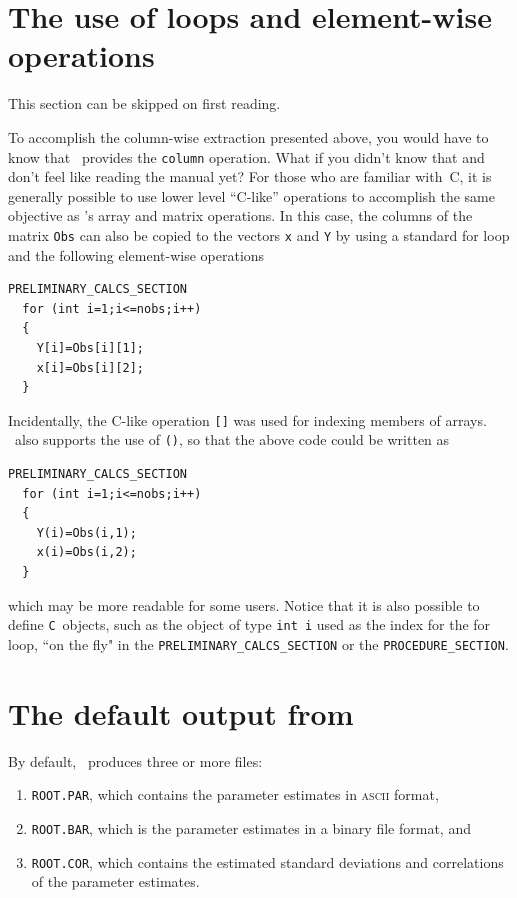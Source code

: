 \documentclass{admbmanual}
\begin{document}
\section{The use of loops and element-wise operations}

This section can be skipped on first reading.

To accomplish the column-wise extraction presented above, 
you would have to know that
\scAD\ provides the \texttt{column} operation. What if you didn't
know that and don't feel like reading the manual yet?
For those who are familiar with~C, 
 it is generally possible to use lower level ``C-like'' operations
to accomplish the same objective as \scAD's array and matrix operations.
In this case, the columns of the matrix \texttt{Obs} can also be
copied to the vectors \texttt{x} and \texttt{Y} by
using a standard for loop and the following element-wise operations
\begin{lstlisting}
PRELIMINARY_CALCS_SECTION
  for (int i=1;i<=nobs;i++)
  {
    Y[i]=Obs[i][1];
    x[i]=Obs[i][2];
  }
\end{lstlisting}
Incidentally, the C-like operation \texttt{[]} was used
for indexing members of arrays. \ADM\ also supports 
the use of \texttt{()}, so that the above code could be written as
\begin{lstlisting}
PRELIMINARY_CALCS_SECTION
  for (int i=1;i<=nobs;i++)
  {
    Y(i)=Obs(i,1);
    x(i)=Obs(i,2);
  }
\end{lstlisting}
which may be more readable for some users.
Notice that it is also possible to define \texttt{C}~objects,
such as the object of type \texttt{int i} used as the index for the 
for loop, ``on the fly" in the
\texttt{PRELIMINARY\_CALCS\_SECTION} or the \texttt{PROCEDURE\_SECTION}.


\section{The default output from \ADM}

By default, \ADM\ produces three or more files: 
\begin{enumerate}
\item \texttt{ROOT.PAR}, which contains the parameter
estimates in \textsc{ascii} format,

\item \texttt{ROOT.BAR}, which is the parameter estimates in a binary file format,
and

\item \texttt{ROOT.COR}, which contains the estimated standard
deviations and correlations of the parameter estimates.
\end{enumerate}
\end{document}

